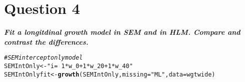 \documentclass{article}\usepackage[]{graphicx}\usepackage[]{color}
\makeatletter
\newcommand{\hlstr}[1]{\textcolor[rgb]{0.192,0.494,0.8}{#1}}%
\newcommand{\hlcom}[1]{\textcolor[rgb]{0.678,0.584,0.686}{\textit{#1}}}%
\newcommand{\hlstd}[1]{\textcolor[rgb]{0.345,0.345,0.345}{#1}}%
\newcommand{\hlkwb}[1]{\textcolor[rgb]{0.69,0.353,0.396}{#1}}%
\newcommand{\hlkwc}[1]{\textcolor[rgb]{0.333,0.667,0.333}{#1}}%
\newcommand{\hlkwd}[1]{\textcolor[rgb]{0.737,0.353,0.396}{\textbf{#1}}}%
\newenvironment{kframe}{%
 \def\at@end@of@kframe{}%
 \ifinner\ifhmode%
  \def\at@end@of@kframe{\end{minipage}}%
  \begin{minipage}{\columnwidth}%
 \fi\fi%
 \def\FrameCommand##1{\hskip\@totalleftmargin \hskip-\fboxsep
 \colorbox{shadecolor}{##1}\hskip-\fboxsep
     \hskip-\linewidth \hskip-\@totalleftmargin \hskip\columnwidth}%
 \MakeFramed {\advance\hsize-\width
   \@totalleftmargin\z@ \linewidth\hsize
   \@setminipage}}%
 {\par\unskip\endMakeFramed%
 \at@end@of@kframe}
\newenvironment{knitrout}{}{} %
\makeatother
\begin{document}
\section{Question 4}
\textbf{\large{\textit{
Fit a longitdinal growth model in SEM and in HLM. Compare and contrast the differences.
}}}

\begin{knitrout}
\color{fgcolor}\begin{kframe}
\begin{alltt}
\hlcom{# SEM intercept only model}
\hlstd{SEMIntOnly} \hlkwb{<-} \hlstr{" i =~ 1*w_0 + 1*w_20 + 1*w_40 "}
\hlstd{SEMIntOnlyfit} \hlkwb{<-} \hlkwd{growth}\hlstd{(SEMIntOnly,} \hlkwc{missing} \hlstd{=} \hlstr{"ML"}\hlstd{,} \hlkwc{data} \hlstd{= wgtwide)}
\end{alltt}



\end{kframe}
\end{knitrout}
\end{document}

